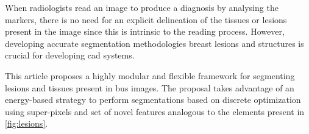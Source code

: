 When radiologists read an image to produce a diagnosis by analysing the markers, there is no need for an explicit delineation of the tissues or lesions present in the image since this is intrinsic to the reading process.
However, developing accurate segmentation methodologies breast lesions and structures is crucial for developing \ac{cad} systems.

%

This article proposes a highly modular and flexible framework for segmenting lesions and tissues present in \ac{bus} images.
The proposal takes advantage of an energy-based strategy to perform segmentations based on discrete optimization using super-pixels and set of novel features analogous to the elements present in \cref{fig:lesions}.

